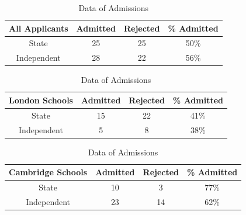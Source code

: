 \documentclass{article}
\theoremstyle{definition}
\theoremstyle{remark}
\begin{document}
\begin{table}[ht!]
    \centering
    \begin{tabular}{cccc}
        All Applicants & Admitted & Rejected & \% Admitted \\
        \hline
        State & 25 & 25 & 50\% \\
        Independent & 28 & 22 & 56\%
    \end{tabular}
    
    \vspace{1em}

    \begin{tabular}{cccc}
        London Schools & Admitted & Rejected & \% Admitted \\
        \hline
        State & 15 & 22 & 41\% \\
        Independent & 5 & 8 & 38\%
    \end{tabular}
    
    \vspace{1em}

    \begin{tabular}{cccc}
        Cambridge Schools & Admitted & Rejected & \% Admitted \\
        \hline
        State & 10 & 3 & 77\% \\
        Independent & 23 & 14 & 62\%
    \end{tabular}

    \caption{Data of Admissions}
    \label{tab:simpson-paradox-data}
\end{table}
\end{document}
